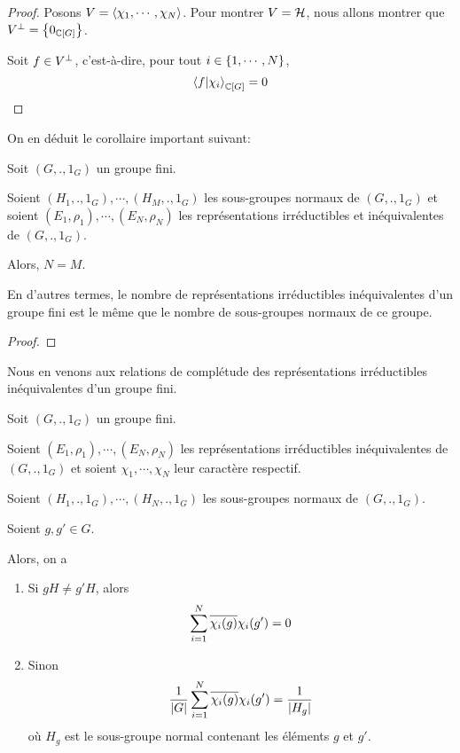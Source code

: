 \ifdefined\outputproof
\begin{proof}
	Posons $V = \left<\chi_{1}, \cdots, \chi_{N}\right>$.
	Pour montrer $V = \mathcal{H}$, nous allons montrer que $V^{\perp} =
	\left\{ 0_{\mathbb{C}[G]} \right\}$.

	Soit $f \in V^{\perp}$, c'est-à-dire, pour tout $i \in \left\{ 1, \cdots,
	N \right\}$,
	\begin{equation}
		\bra{f}\ket{\chi_{i}}_{\mathbb{C}[G]} = 0
	\end{equation}
\end{proof}
\fi

On en déduit le corollaire important suivant:

\begin{corollary}
	Soit $(G, ., 1_{G})$ un groupe fini.

	Soient $(H_{1}, ., 1_{G}), \cdots, (H_{M}, ., 1_{G})$ les sous-groupes normaux
	de $(G, ., 1_{G})$ et soient $(E_{1}, \rho_{1}), \cdots, (E_{N}, \rho_{N})$
	les représentations irréductibles et inéquivalentes de $(G, ., 1_{G})$.

	Alors, $N = M$.

	En d'autres termes, le nombre de représentations irréductibles
	inéquivalentes d'un groupe fini est le même que le nombre de sous-groupes
	normaux de ce groupe.
\end{corollary}

\ifdefined\outputproof
\begin{proof}

\end{proof}
\fi

Nous en venons aux relations de complétude des représentations irréductibles
inéquivalentes d'un groupe fini.

\begin{proposition}
	Soit $(G, ., 1_{G})$ un groupe fini.

	Soient $(E_{1}, \rho_{1}), \cdots, (E_{N}, \rho_{N})$ les représentations
	irréductibles inéquivalentes de $(G, ., 1_{G})$ et soient $\chi_{1}, \cdots,
	\chi_{N}$ leur caractère respectif.

	Soient $(H_{1}, ., 1_{G}), \cdots, (H_{N}, ., 1_{G})$ les sous-groupes normaux
	de $(G, ., 1_{G})$.

	Soient $g, g' \in G$.

	Alors, on a
	\begin{enumerate}
		\item Si $gH \neq g'H$, alors
			\begin{equation}
				\sum_{i = 1}^{N} \overline{\chi_{i}(g)} \chi_{i}(g') = 0
			\end{equation}
		\item Sinon
			\begin{equation}
				\frac{1}{|G|} \sum_{i = 1}^{N}
				\overline{\chi_{i}(g)} \chi_{i}(g') =
				\frac{1}{|H_{g}|}
			\end{equation}
			où $H_{g}$ est le sous-groupe normal contenant les éléments $g$ et
			$g'$.
	\end{enumerate}
\end{proposition}

